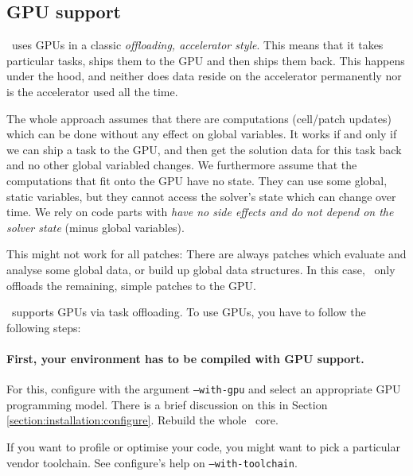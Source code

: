 \subsection{GPU support}

\begin{definition}
 \ExaHyPE\ uses GPUs in a classic \emph{offloading, accelerator style}.
 This means that it takes particular tasks, ships them to the GPU and then ships
 them back. 
 This happens under the hood, and neither does data reside on the accelerator
 permanently nor is the accelerator used all the time.
 
 The whole approach assumes that there are computations (cell/patch updates)
 which can be done without any effect on global variables. 
 It works if and only if we can ship a task to the GPU, and then get the
 solution data for this task back and no other global variabled changes.
 We furthermore assume that the computations that fit onto the GPU have no
 state.
 They can use some global, static variables, but they cannot access the solver's
 state which can change over time. 
 We rely on code parts with \emph{have no side effects and do not depend on
 the solver state} (minus global variables).
 
 This might not work for all patches: There are always patches which evaluate
 and analyse some global data, or build up global data structures. 
 In this case, \ExaHyPE\ only offloads the remaining, simple patches to the GPU. 
\end{definition}


\noindent
\ExaHyPE\ supports GPUs via task offloading.
To use GPUs, you have to follow the following steps:





\paragraph{First, your environment has to be compiled with GPU support.}
For this, configure with the argument \texttt{--with-gpu} and select an
appropriate GPU programming model.
There is a brief discussion on this in Section
\ref{section:installation:configure}.
Rebuild the whole \Peano\ core.

\begin{remark}
 If you want to profile or optimise your code, you might want to pick a
 particular vendor toolchain. See configure's help on \texttt{--with-toolchain}.
\end{remark}



